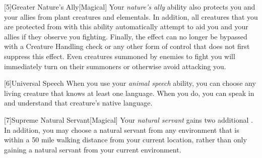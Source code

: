         [5]{Greater Nature's Ally}[Magical] Your \textit{nature's ally} ability also protects you and your allies from plant creatures and elementals.
        In addition, all creatures that you are protected from with this ability automatically attempt to aid you and your allies if they observe you fighting.
        Finally, the effect can no longer be bypassed with a Creature Handling check or any other form of control that does not first suppress this effect.
        Even creatures summoned by enemies to fight you will immediately turn on their summoners or otherwise avoid attacking you.

        [6]{Universal Speech} When you use your \textit{animal speech} ability, you can choose any living creature that knows at least one language.
        When you do, you can speak in and understand that creature's native language.

        [7]{Supreme Natural Servant}[Magical] Your \textit{natural servant} gains two additional .
        In addition, you may choose a natural servant from any environment that is within a 50 mile walking distance from your current location, rather than only gaining a natural servant from your current environment.

